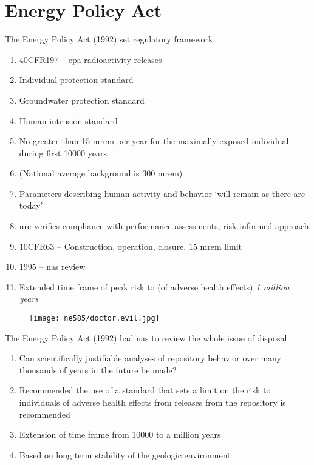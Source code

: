 \documentclass[aspectratio=1610,pdftex,dvipsnames,compress,xcolor={dvipsnames}]{beamer}
\newcommand{\acs}{\acrshort} %
\begin{document}
\section{Energy Policy Act}


\addtocounter{framenumber}{-1} 
\begin{frame}{The Energy Policy Act (1992) set regulatory framework}
    \begin{enumerate}[series=outerlist,topsep=0pt,itemsep=7pt,leftmargin=*,label=(\arabic*)]
        \item[]40CFR197 -- \acs{epa} radioactivity releases
        \item[]Individual protection standard   
        \item[]Groundwater protection standard   
        \item[]Human intrusion standard  
        \item[]No greater than 15 mrem per year for the maximally-exposed individual during first 10000 years
        \item[](National average background is 300 mrem)
        \item[]Parameters describing human activity and behavior `will remain as there are today'
        \item[]\acs{nrc} verifies compliance with performance assessments, risk-informed approach
        \item[]10CFR63 -- Construction, operation, closure, 15 mrem limit
        \item[]1995 -- \acs{nas} review
        \item[]Extended time frame of peak risk to (of adverse health effects) \textit{1 million years} 
    \end{enumerate}
\end{frame}


\begin{frame}{}
    \begin{figure}
        \centering
        \texttt{[image: ne585/doctor.evil.jpg]}
    \end{figure}
\end{frame}


\begin{frame}{The Energy Policy Act (1992) had \acs{nas} to review the whole issue of disposal}
    \begin{enumerate}[series=outerlist,topsep=0pt,itemsep=21pt,leftmargin=*,label=(\arabic*)]
        \item[]Can scientifically justifiable analyses of repository behavior over many thousands of years in the future be made?
        \item[]Recommended the use of a standard that sets a limit on the risk to individuals of adverse
health effects from releases from the repository is recommended
        \item[]Extension of time frame from 10000 to a million years
        \item[]Based on long term stability of the geologic environment
    \end{enumerate}
\end{frame}
\end{document}
